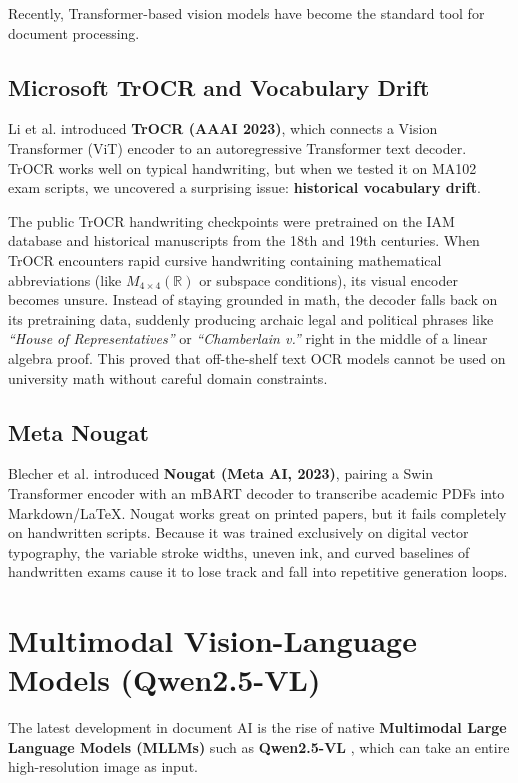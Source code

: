 Recently, Transformer-based vision models have become the standard tool for document processing.

\subsection{Microsoft TrOCR and Vocabulary Drift}
Li et al. \cite{li2023trocr} introduced \textbf{TrOCR (AAAI 2023)}, which connects a Vision Transformer (ViT) encoder to an autoregressive Transformer text decoder. TrOCR works well on typical handwriting, but when we tested it on MA102 exam scripts, we uncovered a surprising issue: \textbf{historical vocabulary drift}.

The public TrOCR handwriting checkpoints were pretrained on the IAM database and historical manuscripts from the 18th and 19th centuries. When TrOCR encounters rapid cursive handwriting containing mathematical abbreviations (like $M_{4 \times 4}(\mathbb{R})$ or subspace conditions), its visual encoder becomes unsure. Instead of staying grounded in math, the decoder falls back on its pretraining data, suddenly producing archaic legal and political phrases like \emph{``House of Representatives''} or \emph{``Chamberlain v.''} right in the middle of a linear algebra proof. This proved that off-the-shelf text OCR models cannot be used on university math without careful domain constraints.

\subsection{Meta Nougat}
Blecher et al. \cite{blecher2023nougat} introduced \textbf{Nougat (Meta AI, 2023)}, pairing a Swin Transformer encoder with an mBART decoder to transcribe academic PDFs into Markdown/\LaTeX. Nougat works great on printed papers, but it fails completely on handwritten scripts. Because it was trained exclusively on digital vector typography, the variable stroke widths, uneven ink, and curved baselines of handwritten exams cause it to lose track and fall into repetitive generation loops.

\section{Multimodal Vision-Language Models (Qwen2.5-VL)}
\label{sec:vlm_frontier}

The latest development in document AI is the rise of native \textbf{Multimodal Large Language Models (MLLMs)} such as \textbf{Qwen2.5-VL} \cite{wang2024qwen2vl}, which can take an entire high-resolution image as input.

